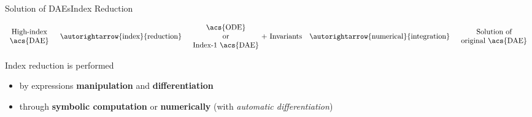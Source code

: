 \begin{frame}{Solution of \aclp{DAE}}{Index Reduction}
  \begin{bbox}
    \vspace{-1.0em}
    \begin{equation*}
      \begin{array}{c}
        \text{High-index} \\
        \text{\acs{DAE}}
      \end{array}
      \quad \autorightarrow{\text{index}}{\text{reduction}} \quad
      \begin{array}{c}
        \text{\acs{ODE}} \\
        \text{or} \\
        \text{Index-1 \acs{DAE}} \\
      \end{array} {\!+~\text{Invariants}}
      \quad \autorightarrow{\text{numerical}}{\text{integration}} \quad
      \begin{array}{c}
        \text{Solution of} \\
        \text{original \acs{DAE}}
      \end{array}
    \end{equation*}
  \end{bbox}
  \vspace{1.0em}
  Index reduction is performed
  \begin{itemize}
    \item by expressions \textbf{manipulation} and \textbf{differentiation}
    \item through \textbf{symbolic computation} or \textbf{numerically} (with \emph{automatic differentiation})
  \end{itemize}
  \vspace{0.5em}
\end{frame}

